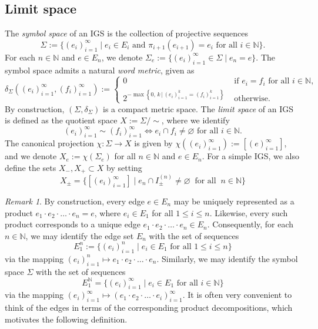 \documentclass{amsart}
\numberwithin{equation}{section}
\theoremstyle{definition}
\theoremstyle{remark}
\newtheorem{remark}[equation]{Remark}
\newcommand{\N}{\mathbb{N}}
\begin{document}
\subsection{Limit space} The \emph{symbol space} of an IGS is the collection of projective sequences
    \[
        \Sigma := \big\{(e_i)_{i=1}^\infty \mid e_i\in E_i\text{ and }\pi_{i+1}(e_{i+1})=e_i\text{ for all }i\in\N\big\}.
    \]
For each \(n\in \N\) and \(e\in E_n\), we denote \(\Sigma_e:=\{(e_i)_{i=1}^\infty\in \Sigma\mid e_n=e\}\). The symbol space admits a natural \emph{word metric}, given as
    \[
        \delta_{\Sigma}((e_i)_{i = 1}^\infty,(f_i)_{i = 1}^\infty) :=
        \begin{cases}
            0 & \text{ if } e_i = f_i \text{ for all } i \in \N,\\
            2^{-\max \left\{0,\, k \, \big| \,  (e_i)_{i = 1}^k = (f_i)_{i = 1}^k \right\}} & \text{ otherwise.}
        \end{cases}
    \]
By construction, \((\Sigma, \delta_\Sigma)\) is a compact metric space. The \emph{limit space} of an IGS is defined as the quotient space \(X:=\Sigma/\sim\), where we identify
    \[
        (e_i)_{i=1}^\infty\sim(f_i)_{i=1}^\infty\iff e_i\cap f_i\neq \varnothing\text{ for all }i\in\N.
    \]
The canonical projection \(\chi\colon \Sigma \to X\) is given by \(\chi((e_i)_{i=1}^\infty):=[(e)_{i=1}^\infty]\), and we denote \(X_e:=\chi(\Sigma_e)\) for all \(n\in\N\) and \(e\in E_n\). For a simple IGS, we also define the sets \(X_-,X_+\subset X\) by setting
    \[
        X_\pm=\{[(e_i)_{i=1}^\infty]\mid e_n\cap I_{\pm}^{(n)}\neq\varnothing\;\;\text{for all}\;\;n\in\N\}
    \]



\begin{remark}\label{Remark: Product Decomposition}
By construction, every edge \(e\in E_n\) may be uniquely represented as a product \(e_1\cdot e_2\cdot \ldots \cdot e_n =e\), where \(e_i\in E_1\) for all \(1\leq i \leq n\). Likewise, every such product corresponds to a unique edge \(e_1\cdot e_2\cdot \ldots \cdot e_n\in E_n\). Consequently, for each \(n\in \N\), we may identify the edge set \(E_n\) with the set of sequences
    \[
        E_1^n:=\{(e_i)_{i=1}^n\mid e_i\in E_1\text{ for all }1\leq i \leq n\}
    \]
via the mapping \((e_i)_{i=1}^n\mapsto e_1\cdot e_2\cdot \ldots \cdot e_n\). Similarly, we may identify the symbol space \(\Sigma\) with the set of sequences 
    \[
        E_1^\N=\{(e_i)_{i=1}^\infty\mid e_i\in E_1\text{ for all } i\in \N\}
    \]
via the mapping \((e_i)_{i=1}^\infty \mapsto (e_1\cdot e_2\cdot \ldots \cdot e_i)_{i=1}^\infty\). It is often very convenient to think of the edges in terms of the corresponding product decompositions, which motivates the following definition.
\end{remark}
\end{document}
